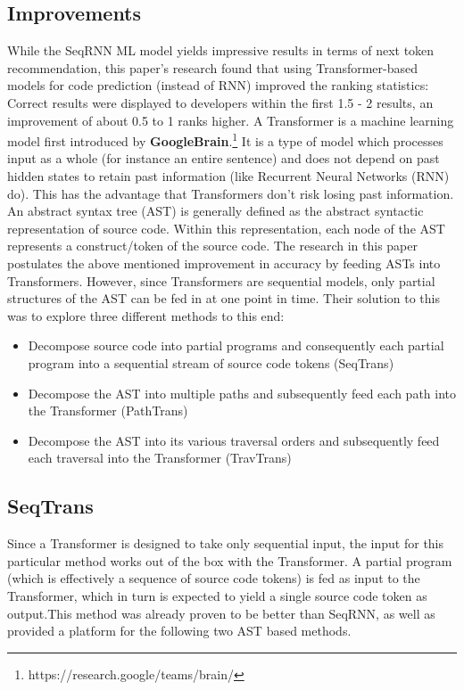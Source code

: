 \documentclass[sigplan,screen,9pt]{acmart}
\begin{document}
\subsection{Improvements}
While the SeqRNN ML model yields impressive results in terms of next token recommendation, this paper's research found that using Transformer-based models for code prediction (instead of RNN) improved the ranking statistics: Correct results were displayed to developers within the first 1.5 - 2 results, an improvement of about 0.5 to 1 ranks higher.\cite{FeedTree}
\newline
A Transformer is a machine learning model first introduced by \textbf{GoogleBrain}.\footnote{https://research.google/teams/brain/} It is a type of model which processes input as a whole (for instance an entire sentence) and does not depend on past hidden states to retain past information (like Recurrent Neural Networks (RNN) do).\cite{vaswani2017attention} This has the advantage that Transformers don't risk losing past information.
\newline
An abstract syntax tree (AST) is generally defined as the abstract syntactic representation of source code.\cite{AST} Within this representation, each node of the AST represents a construct/token of the source code. The research in this paper postulates the above mentioned improvement in accuracy by feeding ASTs into Transformers. However, since Transformers are sequential models, only partial structures of the AST can be fed in at one point in time. Their solution to this was to explore three different methods to this end:\cite{FeedTree}
\begin{itemize}
    \item Decompose source code into partial programs and consequently each partial program into a sequential stream of source code tokens (SeqTrans)
    \item Decompose the AST into multiple paths and subsequently feed each path into the Transformer (PathTrans)
    \item Decompose the AST into its various traversal orders and subsequently feed each traversal into the Transformer (TravTrans)
\end{itemize}

\subsection{SeqTrans}
Since a Transformer is designed to take only sequential input, the input for this particular method works out of the box with the Transformer. A partial program (which is effectively a sequence of source code tokens) is fed as input to the Transformer, which in turn is expected to yield a single source code token as output.This method was already proven to be better than SeqRNN, as well as provided a platform for the following two AST based methods.
\end{document}
